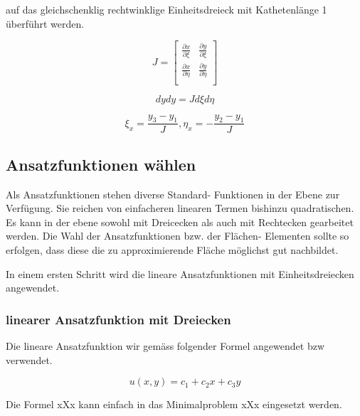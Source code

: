 auf das gleichschenklig rechtwinklige Einheitsdreieck mit Kathetenlänge 1 überführt werden.

\begin{equation}
			J = \left[ \begin{array}{rr}
\frac{\partial x}{\partial \xi} & \frac{\partial y}{\partial \xi}  \\
\frac{\partial x}{\partial \eta} & \frac{\partial y}{\partial \eta}  \\
\end{array}\right] 
			\label{fem:JocobiDeterminante}
\end{equation}

\begin{equation}
			dy dy = J d\xi d\eta
			\label{fem:newTransformation}
\end{equation}

\begin{equation}
			\xi_x = \frac{y_3 - y_1}{J}, \eta_x = -\frac{y_2 - y_1}{J}
			\label{fem:newKoordinate}
\end{equation}



\subsection{Ansatzfunktionen wählen}

Als Ansatzfunktionen stehen diverse Standard- Funktionen in der Ebene zur Verfügung. Sie reichen von einfacheren linearen Termen bishinzu quadratischen. Es kann in der ebene sowohl mit Dreicecken als auch mit Rechtecken gearbeitet werden. Die Wahl der Ansatzfunktionen bzw. der Flächen- Elementen sollte so erfolgen, dass diese die zu approximierende Fläche möglichst gut nachbildet.

In einem ersten Schritt wird die lineare Ansatzfunktionen mit Einheitsdreiecken angewendet.


\subsubsection{linearer Ansatzfunktion mit Dreiecken
\label{fem:subsection:bonorum}}

Die lineare Ansatzfunktion wir gemäss folgender Formel angewendet bzw verwendet.

\begin{equation}
u(x,y) = c_1 + c_2x + c_3y
\label{fem:equationSchwarzLinear}
\end{equation}

Die Formel xXx kann einfach in das Minimalproblem xXx eingesetzt werden.

